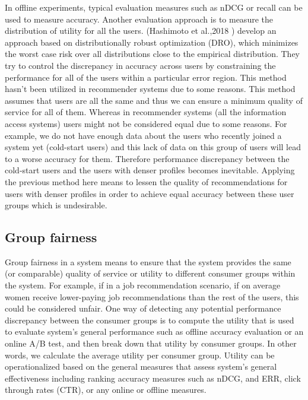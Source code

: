     In offline experiments, typical evaluation measures such as nDCG or recall can be used to measure accuracy. Another evaluation approach is to measure the distribution of utility for all the users. (Hashimoto et al.,2018 \cite{hashimoto2018fairness}) develop an approach based on distributionally robust optimization (DRO), which minimizes the worst case risk over all distributions close to the empirical distribution. They try to control the discrepancy in accuracy across users by constraining the performance for all of the users within a particular error region. This method hasn't been utilized in recommender systems due to some reasons. This method assumes that users are all the same and thus we can ensure a minimum quality of service for all of them. Whereas in recommender systems (all the information access systems) users might not be considered equal due to some reasons. For example, we do not have enough data about the users who recently joined a system yet (cold-start users) and this lack of data on this group of users will lead to a worse accuracy for them. Therefore performance discrepancy between the cold-start users and the users with denser profiles becomes inevitable. Applying the previous method here means to lessen the quality of recommendations for users with denser profiles in order to achieve equal accuracy between these user groups which is undesirable.
    
    \subsection{Group fairness}
    Group fairness in a system means to ensure that the system provides the same (or comparable) quality of service or utility to different consumer groups within the system. For example, if in a job recommendation scenario, if on average women receive lower-paying job recommendations than the rest of the users, this could be considered unfair.
    One way of detecting any potential performance discrepancy between the consumer groups is to compute the utility that is used to evaluate system's general performance such as offline accuracy evaluation or an online A/B test, and then break down that utility by consumer groups. In other words, we calculate the average utility per consumer group. Utility can be operationalized based on the general measures that assess system's general effectiveness including ranking accuracy measures such as nDCG, and ERR, click through rates (CTR), or any online or offline measures.  
    
